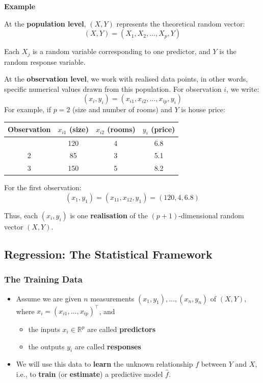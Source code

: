 \documentclass[
  letterpaper,
  DIV=11,
  numbers=noendperiod]{scrartcl}
\providecommand{\tightlist}{%
  \setlength{\itemsep}{0pt}\setlength{\parskip}{0pt}}\usepackage{longtable,booktabs,array}
\begin{document}
\textbf{Example}

At the \textbf{population level}, \((X, Y)\) represents the theoretical
random vector: \[ (X, Y) = (X_1, X_2, \dots, X_p, Y) \]

Each \(X_j\) is a random variable corresponding to one predictor, and
\(Y\) is the random response variable.

At the \textbf{observation level}, we work with realised data points, in
other words, specific numerical values drawn from this population. For
observation \(i\), we write:
\[ (x_i, y_i) = (x_{i1}, x_{i2}, \dots, x_{ip}, y_i) \] For example, if
\(p = 2\) (size and number of rooms) and \(Y\) is house price:

\begin{longtable}[]{@{}cccc@{}}
\toprule\noalign{}
Observation & \(x_{i1}\) (size) & \(x_{i2}\) (rooms) & \(y_i\)
(price) \\
\midrule\noalign{}
\endhead
\bottomrule\noalign{}
\endlastfoot
1 & 120 & 4 & 6.8 \\
2 & 85 & 3 & 5.1 \\
3 & 150 & 5 & 8.2 \\
\end{longtable}

For the first observation:
\[ (x_1, y_1) = (x_{11}, x_{12}, y_1) = (120, 4, 6.8) \]

Thus, each \((x_i, y_i)\) is one \textbf{realisation} of the
\((p + 1)\)-dimensional random vector \((X, Y)\).

\subsection{Regression: The Statistical
Framework}\label{regression-the-statistical-framework}

\subsubsection{The Training Data}\label{the-training-data}

\begin{itemize}
\tightlist
\item
  Assume we are given \(n\) measurements
  \((x_1, y_1), \dots, (x_n, y_n)\) of \((X, Y)\), where
  \(x_i = (x_{i1}, \dots, x_{ip})^\top\), and

  \begin{itemize}
  \tightlist
  \item
    the inputs \(x_i \in \mathbb{R}^p\) are called \textbf{predictors}
  \item
    the outputs \(y_i\) are called \textbf{responses}
  \end{itemize}
\item
  We will use this data to \textbf{learn} the unknown relationship \(f\)
  between \(Y\) and \(X\), i.e., to \textbf{train} (or
  \textbf{estimate}) a predictive model \(\hat{f}\).
\end{itemize}
\end{document}
